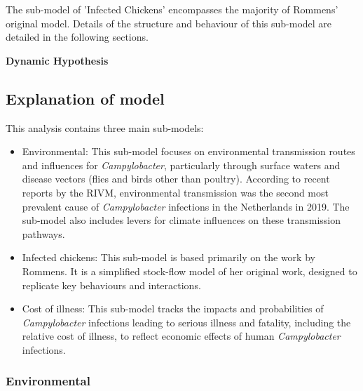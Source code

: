 The sub-model of 'Infected Chickens' encompasses the majority of Rommens' original model. Details of the structure and behaviour of this sub-model are detailed in the following sections. 

\textbf{Dynamic Hypothesis}



   
\subsection{Explanation of model}
   
This analysis contains three main sub-models:

\begin{itemize}
    \item Environmental: This sub-model focuses on environmental transmission routes and influences for \textit{Campylobacter}, particularly through surface waters and disease vectors (flies and birds other than poultry). According to recent reports by the RIVM, environmental transmission was the second most prevalent cause of \textit{Campylobacter} infections in the Netherlands in 2019. The sub-model also includes levers for climate influences on these transmission pathways.
    \item Infected chickens: This sub-model is based primarily on the work by Rommens. It is a simplified stock-flow model of her original work, designed to replicate key behaviours and interactions.
    \item Cost of illness: This sub-model tracks the impacts and probabilities of \textit{Campylobacter} infections leading to serious illness and fatality, including the relative cost of illness, to reflect economic effects of human \textit{Campylobacter} infections.

\end{itemize}

\subsubsection*{Environmental}

